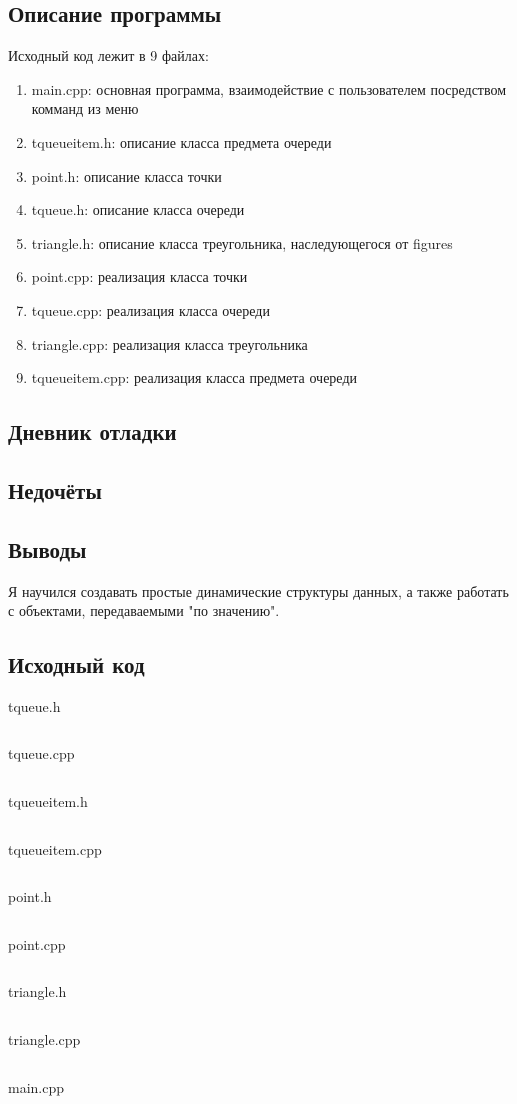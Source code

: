 \documentclass[12pt]{article}
\begin{document}
\subsection*{Описание программы}

Исходный код лежит в 9 файлах:
\begin{enumerate}
\item main.cpp: основная программа, взаимодействие с пользователем посредством комманд из меню

\item tqueueitem.h:    описание класса предмета очереди
\item point.h:     описание класса точки
\item tqueue.h:  описание класса очереди
\item triangle.h: описание класса треугольника, наследующегося от figures
\item point.cpp:     реализация класса точки
\item tqueue.cpp:  реализация класса очереди
\item triangle.cpp: реализация класса треугольника
\item tqueueitem.cpp:    реализация класса предмета очереди

\end{enumerate}

\subsection*{Дневник отладки}


\subsection*{Недочёты}


\subsection*{Выводы}

Я научился создавать простые динамические структуры данных, а также работать с объектами, передаваемыми "по значению".


\vfill

\subsection*{Исходный код}

{\Huge tqueue.h}
\inputminted{C++}{tqueue.h}
    \pagebreak

{\Huge tqueue.cpp}
\inputminted{C++}{tqueue.cpp}
\pagebreak

{\Huge tqueueitem.h}
\inputminted{C++}{tqueueitem.h}
\pagebreak

{\Huge tqueueitem.cpp}
\inputminted{C++}{tqueueitem.cpp}
\pagebreak
    
{\Huge point.h}
\inputminted{C++}{point.h}
    \pagebreak

{\Huge point.cpp}
\inputminted{C++}{point.cpp}
    \pagebreak

{\Huge triangle.h}
\inputminted{C++}{triangle.h}
\pagebreak

{\Huge triangle.cpp}
\inputminted{C++}{triangle.cpp}
\pagebreak
    
{\Huge main.cpp}
\inputminted{C++}{main.cpp}
    \pagebreak
    
\end{document}
